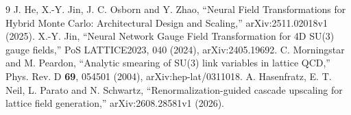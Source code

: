 \documentclass[aps,prd,superscriptaddress,nofootinbib,eqsecnum,floatfix,amsmath,longbibliography]{revtex4-2}
\begin{document}
\FloatBarrier
\begin{thebibliography}{9}
 J. He, X.-Y. Jin, J. C. Osborn and Y. Zhao,
``Neural Field Transformations for Hybrid Monte Carlo: Architectural Design
and Scaling,'' arXiv:2511.02018v1 (2025).
 X.-Y. Jin, ``Neural Network Gauge Field Transformation for 4D
SU(3) gauge fields,'' PoS LATTICE2023, 040 (2024), arXiv:2405.19692.
 C. Morningstar and M. Peardon,
``Analytic smearing of SU(3) link variables in lattice QCD,''
Phys. Rev. D \textbf{69}, 054501 (2004), arXiv:hep-lat/0311018.
 A. Hasenfratz, E. T. Neil, L. Parato and N. Schwartz,
``Renormalization-guided cascade upscaling for lattice field generation,''
arXiv:2608.28581v1 (2026).
\end{thebibliography}
\end{document}
